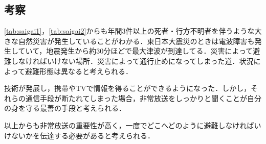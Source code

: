 \documentclass[a4j,11pt]{jsarticle}
\begin{document}
\subsection{考察}
\ref{tab:saigai1}，\ref{tab:saigai2}からも年間3件以上の死者・行方不明者を伴うような大きな自然災害が発生していることがわかる．東日本大震災のときは電波障害も発生していて，地震発生から約30分ほどで最大津波が到達してる．災害によって避難しなければいけない場所．災害によって通行止めになってしまった道．状況によって避難形態は異なると考えられる．

技術が発展し，携帯やTVで情報を得ることができるようになった．しかし，それらの通信手段が断たれてしまった場合，非常放送をしっかりと聞くことが自分の身を守る最善の手段と考えられる．

以上からも非常放送の重要性が高く，一度でどこへどのように避難しなければいけないかを伝達する必要があると考えられる．

\newpage
\end{document}
